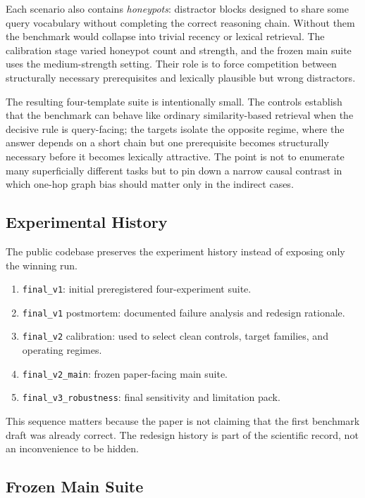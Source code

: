 \documentclass[10pt]{article}
\begin{document}
Each scenario also contains \emph{honeypots}: distractor blocks designed to share some query vocabulary without completing the correct reasoning chain. Without them the benchmark would collapse into trivial recency or lexical retrieval. The calibration stage varied honeypot count and strength, and the frozen main suite uses the medium-strength setting. Their role is to force competition between structurally necessary prerequisites and lexically plausible but wrong distractors.

The resulting four-template suite is intentionally small. The controls establish that the benchmark can behave like ordinary similarity-based retrieval when the decisive rule is query-facing; the targets isolate the opposite regime, where the answer depends on a short chain but one prerequisite becomes structurally necessary before it becomes lexically attractive. The point is not to enumerate many superficially different tasks but to pin down a narrow causal contrast in which one-hop graph bias should matter only in the indirect cases.

\subsection{Experimental History}

The public codebase preserves the experiment history instead of exposing only the winning run.
\begin{enumerate}[leftmargin=1.3em]
  \item \texttt{final\_v1}: initial preregistered four-experiment suite.
  \item \texttt{final\_v1} postmortem: documented failure analysis and redesign rationale.
  \item \texttt{final\_v2} calibration: used to select clean controls, target families, and operating regimes.
  \item \texttt{final\_v2\_main}: frozen paper-facing main suite.
  \item \texttt{final\_v3\_robustness}: final sensitivity and limitation pack.
\end{enumerate}
This sequence matters because the paper is not claiming that the first benchmark draft was already correct. The redesign history is part of the scientific record, not an inconvenience to be hidden.

\subsection{Frozen Main Suite}
\end{document}
